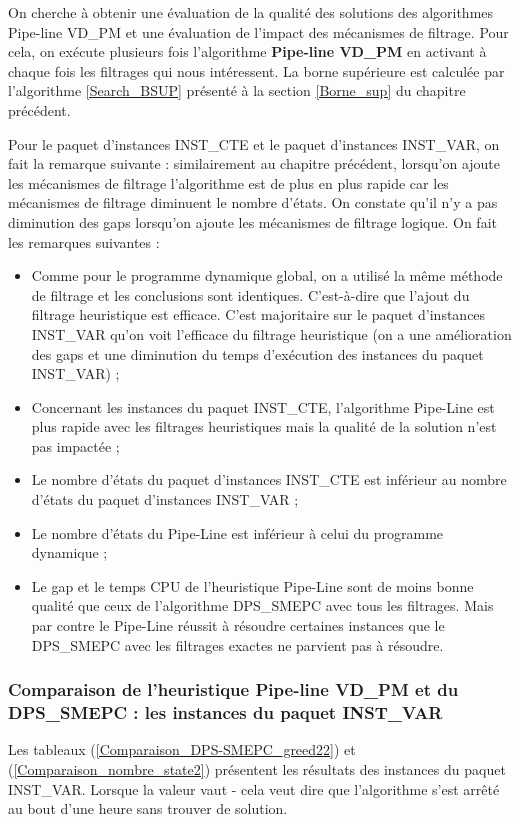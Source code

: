 On cherche à obtenir une évaluation de la qualité des solutions des algorithmes Pipe-line VD\_PM et une évaluation de l'impact des mécanismes de filtrage. Pour cela, on exécute plusieurs fois l'algorithme \textbf{Pipe-line VD\_PM} en activant à chaque fois les filtrages qui nous intéressent. La borne supérieure est calculée par l'algorithme \ref{Search_BSUP} présenté à la section \ref{Borne_sup} du chapitre précédent.

Pour le paquet d'instances INST\_CTE et le paquet d'instances INST\_VAR, on fait la remarque suivante : similairement au chapitre précédent, lorsqu'on ajoute les mécanismes de filtrage l'algorithme est de plus en plus rapide car les mécanismes de filtrage diminuent le nombre d'états. On constate qu'il n'y a pas diminution des gaps  lorsqu'on ajoute les mécanismes de filtrage logique.
On fait les remarques suivantes :
\begin{itemize}[label=$\square$]
	
	\item Comme pour le programme dynamique global, on a utilisé la même méthode de filtrage et les conclusions sont identiques. C'est-à-dire que l'ajout du filtrage heuristique est efficace. C'est majoritaire sur le paquet d'instances INST\_VAR qu'on voit l'efficace du filtrage heuristique (on a une amélioration des gaps et une diminution du temps d'exécution des instances du paquet INST\_VAR) ;
	\item  Concernant les instances du paquet INST\_CTE, l'algorithme Pipe-Line est plus rapide avec les filtrages heuristiques mais la qualité de la solution n'est pas impactée ; 
	
	\item  Le nombre d'états du paquet d'instances INST\_CTE est inférieur au nombre d'états du paquet d'instances INST\_VAR ;
	\item  Le nombre d'états du Pipe-Line est inférieur à celui du programme dynamique ;
	\item  Le gap  et le temps CPU de l'heuristique Pipe-Line sont de moins bonne qualité que ceux de l'algorithme DPS\_SMEPC avec tous les filtrages. Mais par contre le Pipe-Line réussit à résoudre certaines instances que le DPS\_SMEPC avec les filtrages exactes ne parvient pas à résoudre.
\end{itemize}
\subsubsection{Comparaison de l'heuristique Pipe-line VD\_PM et du DPS\_SMEPC : les instances du paquet INST\_VAR}
Les tableaux (\ref{Comparaison_DPS-SMEPC_greed22}) et (\ref{Comparaison_nombre_state2}) présentent les résultats des instances du paquet INST\_VAR. 
Lorsque la valeur vaut \og - \fg{} cela veut dire que l'algorithme s'est arrêté au bout d'une heure sans trouver de solution. 


